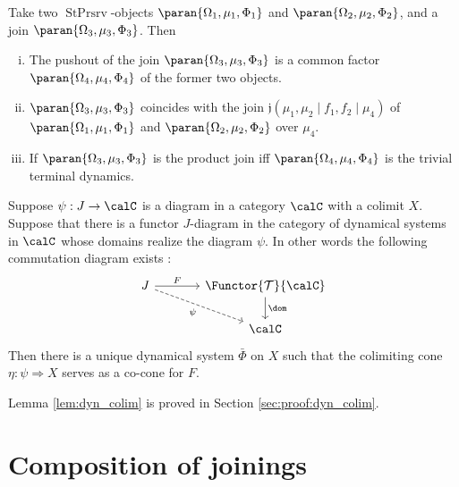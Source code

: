 \documentclass[12pt,oneside,pb-diagram]{article}
\DeclareMathOperator{\sps}{StPrsrv}
\newcommand{\join}{\mathfrak{j}}
\begin{document}
\begin{theorem} \label{thm:join_project}
	Take two $\sps$-objects $\paran{ \Omega_1, \mu_1, \Phi_1 }$ and $\paran{ \Omega_2, \mu_2, \Phi_2 }$, and a join $\paran{ \Omega_3, \mu_3, \Phi_3 }$. Then 
	\begin{enumerate} [(i)]
		\item The pushout of the join $\paran{ \Omega_3, \mu_3, \Phi_3 }$ is a common factor $\paran{ \Omega_4, \mu_4, \Phi_4 }$ of the former two objects.
		\item $\paran{ \Omega_3, \mu_3, \Phi_3 }$ coincides with the join $\join(\mu_1, \mu_2 \mid f_1, f_2 \mid \mu_4)$ of $\paran{ \Omega_1, \mu_1, \Phi_1 }$ and $\paran{ \Omega_2, \mu_2, \Phi_2 }$ over $\mu_4$.
		\item If $\paran{ \Omega_3, \mu_3, \Phi_3 }$ is the product join iff $\paran{ \Omega_4, \mu_4, \Phi_4 }$ is the trivial terminal dynamics.
	\end{enumerate}
\end{theorem} 

\begin{lemma}  \label{lem:dyn_colim}
	Suppose $\psi : J\to \calC$ is a diagram in a category $\calC$ with a colimit $X$. Suppose that there is a functor $J$-diagram in the category of dynamical systems in $\calC$ whose domains realize the diagram $\psi$. In other words the following commutation diagram exists :
	\[\begin{tikzcd} [column sep = large]
		J \arrow[r, "F"] \arrow[dr, dashed, "\psi"'] & \Functor{\Time}{\calC} \arrow[d, "\dom"] \\
		& \calC
	\end{tikzcd}\]
	Then there is a unique dynamical system $\bar{\Phi}$ on $X$ such that the colimiting cone $\eta : \psi \Rightarrow X$ serves as a co-cone for $F$.
\end{lemma}

Lemma \ref{lem:dyn_colim} is proved in Section \ref{sec:proof:dyn_colim}.

\section{Composition of joinings} \label{sec:join_compose}
\end{document}
